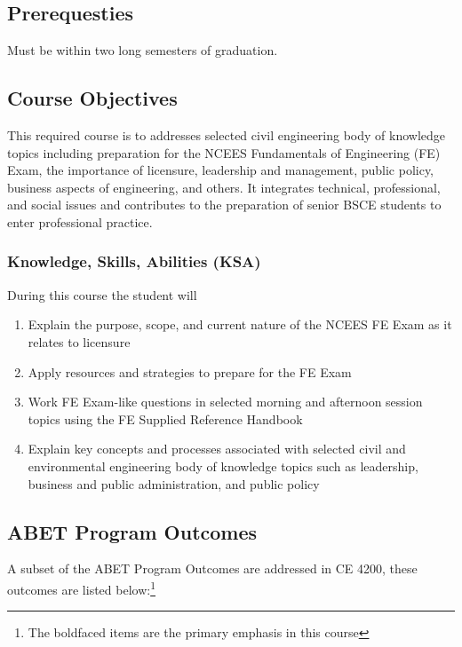 \documentclass[12pt]{article}
\begin{document}
\subsection*{{Prerequesties}}
Must be within two long semesters of graduation.
\subsection*{{Course Objectives}}
This required course is to addresses selected civil engineering body of knowledge topics 
including preparation for the NCEES Fundamentals of Engineering (FE) Exam, 
the importance of licensure, leadership and management, public policy, 
business aspects of engineering, and others. It integrates technical, professional, and social
issues and contributes to the preparation of senior BSCE students to enter professional practice.
\subsubsection*{{Knowledge, Skills, Abilities (KSA)}}
During this course the student will
\begin{enumerate}
\item Explain the purpose, scope, and current nature of the NCEES FE Exam as it relates
to licensure
\item Apply resources and strategies to prepare for the FE Exam
\item Work FE Exam-like questions in selected morning and afternoon session topics
using the FE Supplied Reference Handbook
\item Explain key concepts and processes associated with selected civil and
environmental engineering body of knowledge topics such as leadership, business
and public administration, and public policy
\end{enumerate}

\subsection*{{ABET Program Outcomes}}
A subset of the ABET Program Outcomes are addressed in CE 4200, 
these outcomes are listed below:\footnote{The boldfaced items are the primary emphasis in this course}
\end{document}
